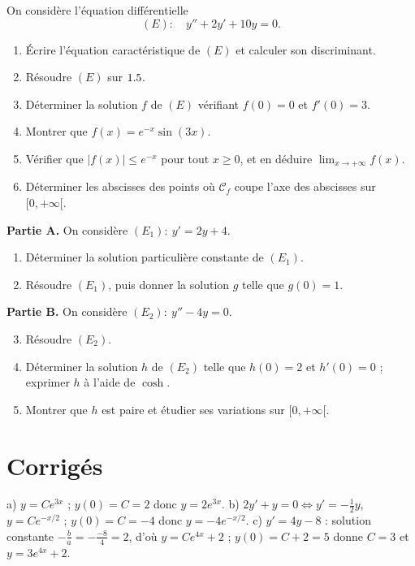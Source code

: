 On considère l'équation différentielle
\[
(E):\quad y''+2y'+10y=0.
\]
\begin{enumerate}[label=\arabic*)]
\item Écrire l'équation caractéristique de $(E)$ et calculer son discriminant.
\item Résoudre $(E)$ sur $1.5$.
\item Déterminer la solution $f$ de $(E)$ vérifiant $f(0)=0$ et $f'(0)=3$.
\item Montrer que $f(x)=e^{-x}\sin(3x)$.
\item Vérifier que $|f(x)|\le e^{-x}$ pour tout $x\ge0$, et en déduire
$\displaystyle\lim_{x\to+\infty}f(x)$.
\item Déterminer les abscisses des points où $\mathcal C_f$ coupe l'axe des
abscisses sur $[0,+\infty[$.
\end{enumerate}

\textbf{Partie A.} On considère $(E_1):\ y'=2y+4$.
\begin{enumerate}[label=\arabic*)]
\item Déterminer la solution particulière constante de $(E_1)$.
\item Résoudre $(E_1)$, puis donner la solution $g$ telle que $g(0)=1$.
\end{enumerate}
\textbf{Partie B.} On considère $(E_2):\ y''-4y=0$.
\begin{enumerate}[label=\arabic*)]
\setcounter{enumi}{2}
\item Résoudre $(E_2)$.
\item Déterminer la solution $h$ de $(E_2)$ telle que $h(0)=2$ et $h'(0)=0$ ;
exprimer $h$ à l'aide de $\cosh$.
\item Montrer que $h$ est paire et étudier ses variations sur $[0,+\infty[$.
\end{enumerate}

\section{Corrigés}

a) $y=Ce^{3x}$ ; $y(0)=C=2$ donc $y=2e^{3x}$.\;
b) $2y'+y=0\Leftrightarrow y'=-\tfrac12 y$, $y=Ce^{-x/2}$ ; $y(0)=C=-4$ donc
$y=-4e^{-x/2}$.\;
c) $y'=4y-8$ : solution constante $-\frac{b}{a}=-\frac{-8}{4}=2$, d'où
$y=Ce^{4x}+2$ ; $y(0)=C+2=5$ donne $C=3$ et $y=3e^{4x}+2$.

